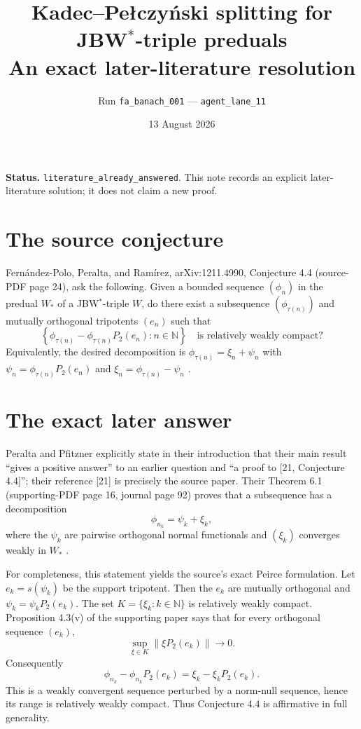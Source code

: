 \documentclass[11pt]{article}
\title{Kadec--Pe\l czy\'nski splitting for JBW$^*$-triple preduals\\
\large An exact later-literature resolution}
\author{Run \texttt{fa\_banach\_001} --- \texttt{agent\_lane\_11}}
\date{13 August 2026}
\begin{document}
\maketitle

\textbf{Status.} \texttt{literature\_already\_answered}. This note records an
explicit later-literature solution; it does not claim a new proof.

\section*{The source conjecture}

Fern\'andez-Polo, Peralta, and Ram\'irez, arXiv:1211.4990, Conjecture 4.4
(source-PDF page 24), ask the following. Given a bounded sequence
$(\phi_n)$ in the predual $W_*$ of a JBW$^*$-triple $W$, do there exist a
subsequence $(\phi_{\tau(n)})$ and mutually orthogonal tripotents $(e_n)$
such that
\[
 \left\{\phi_{\tau(n)}-\phi_{\tau(n)}P_2(e_n):n\in\mathbb N\right\}
 \quad\text{is relatively weakly compact?}
\]
Equivalently, the desired decomposition is
$\phi_{\tau(n)}=\xi_n+\psi_n$ with
$\psi_n=\phi_{\tau(n)}P_2(e_n)$ and
$\xi_n=\phi_{\tau(n)}-\psi_n$ \cite{source}.

\section*{The exact later answer}

Peralta and Pfitzner explicitly state in their introduction that their main result
``gives a positive answer'' to an earlier question and ``a proof to
[21, Conjecture 4.4]''; their reference [21] is precisely the source paper.
Their Theorem 6.1 (supporting-PDF page 16, journal page 92) proves that a
subsequence has a decomposition
\[
  \phi_{n_k}=\psi_k+\xi_k,
\]
where the $\psi_k$ are pairwise orthogonal normal functionals and
$(\xi_k)$ converges weakly in $W_*$ \cite{answer}.

For completeness, this statement yields the source's exact Peirce formulation.
Let $e_k=s(\psi_k)$ be the support tripotent. Then the $e_k$ are mutually
orthogonal and $\psi_k=\psi_kP_2(e_k)$. The set
$K=\{\xi_k:k\in\mathbb N\}$ is relatively weakly compact. Proposition 4.3(v)
of the supporting paper says that for every orthogonal sequence $(e_k)$,
\[
 \sup_{\xi\in K}\|\xi P_2(e_k)\|\longrightarrow0.
\]
Consequently
\[
 \phi_{n_k}-\phi_{n_k}P_2(e_k)
   =\xi_k-\xi_kP_2(e_k).
\]
This is a weakly convergent sequence perturbed by a norm-null sequence, hence
its range is relatively weakly compact. Thus Conjecture 4.4 is affirmative in
full generality.
\end{document}
